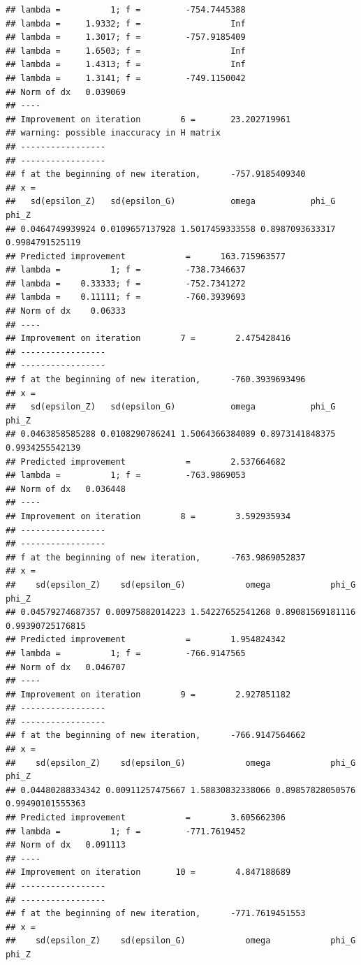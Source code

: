 \documentclass[12pt,a4paper,]{article}
\newcommand{\0}{\mathbf{0}}
\begin{document}
\begin{verbatim}
## lambda =          1; f =         -754.7445388 
## lambda =     1.9332; f =                  Inf 
## lambda =     1.3017; f =         -757.9185409 
## lambda =     1.6503; f =                  Inf 
## lambda =     1.4313; f =                  Inf 
## lambda =     1.3141; f =         -749.1150042 
## Norm of dx   0.039069
## ----
## Improvement on iteration        6 =       23.202719961
## warning: possible inaccuracy in H matrix
## -----------------
## -----------------
## f at the beginning of new iteration,      -757.9185409340 
## x =
##   sd(epsilon_Z)   sd(epsilon_G)           omega           phi_G           phi_Z 
## 0.0464749939924 0.0109657137928 1.5017459333558 0.8987093633317 0.9984791525119 
## Predicted improvement            =      163.715963577
## lambda =          1; f =         -738.7346637 
## lambda =    0.33333; f =         -752.7341272 
## lambda =    0.11111; f =         -760.3939693 
## Norm of dx    0.06333
## ----
## Improvement on iteration        7 =        2.475428416
## -----------------
## -----------------
## f at the beginning of new iteration,      -760.3939693496 
## x =
##   sd(epsilon_Z)   sd(epsilon_G)           omega           phi_G           phi_Z 
## 0.0463858585288 0.0108290786241 1.5064366384089 0.8973141848375 0.9934255542139 
## Predicted improvement            =        2.537664682
## lambda =          1; f =         -763.9869053 
## Norm of dx   0.036448
## ----
## Improvement on iteration        8 =        3.592935934
## -----------------
## -----------------
## f at the beginning of new iteration,      -763.9869052837 
## x =
##    sd(epsilon_Z)    sd(epsilon_G)            omega            phi_G            phi_Z 
## 0.04579274687357 0.00975882014223 1.54227652541268 0.89081569181116 0.99390725176815 
## Predicted improvement            =        1.954824342
## lambda =          1; f =         -766.9147565 
## Norm of dx   0.046707
## ----
## Improvement on iteration        9 =        2.927851182
## -----------------
## -----------------
## f at the beginning of new iteration,      -766.9147564662 
## x =
##    sd(epsilon_Z)    sd(epsilon_G)            omega            phi_G            phi_Z 
## 0.04480288334342 0.00911257475667 1.58830832338066 0.89857828050576 0.99490101555363 
## Predicted improvement            =        3.605662306
## lambda =          1; f =         -771.7619452 
## Norm of dx   0.091113
## ----
## Improvement on iteration       10 =        4.847188689
## -----------------
## -----------------
## f at the beginning of new iteration,      -771.7619451553 
## x =
##    sd(epsilon_Z)    sd(epsilon_G)            omega            phi_G            phi_Z 

\end{verbatim}
\end{document}

